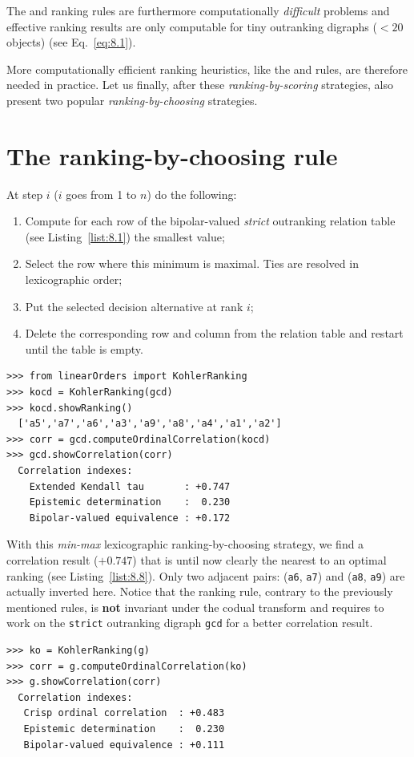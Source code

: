 The \Kemeny and \Slater ranking rules are furthermore computationally \emph{difficult} problems and effective ranking results are only computable for tiny outranking digraphs ($< 20$ objects) (see Eq.~\vref{eq:8.1}). 

More computationally efficient ranking heuristics, like the \Copeland and \NetFlows rules, are therefore needed in practice. Let us finally, after these \emph{ranking-by-scoring} strategies, also present two popular \emph{ranking-by-choosing} strategies.

\section{The \Kohler ranking-by-choosing rule}
\label{sec:8.6}

\begin{definition}\label{def:8.4}
  
\noindent At step $i$ ($i$ goes from 1 to $n$) do the following:
\begin{enumerate}[leftmargin=0.5cm,rightmargin=0.5cm,topsep=1pt]
\item Compute for each row of the bipolar-valued \emph{strict} outranking relation table (see Listing~\vref{list:8.1}) the smallest value;
\item Select the row where this minimum is maximal. Ties are resolved in lexicographic order;
\item Put the selected decision alternative at rank $i$;
\item Delete the corresponding row and column from the relation table and restart until the table is empty.
\end{enumerate}
\end{definition}
\begin{lstlisting}[caption={Computing a \Kohler ranking},label=list:8.13]   
>>> from linearOrders import KohlerRanking
>>> kocd = KohlerRanking(gcd)
>>> kocd.showRanking()
  ['a5','a7','a6','a3','a9','a8','a4','a1','a2']
>>> corr = gcd.computeOrdinalCorrelation(kocd)
>>> gcd.showCorrelation(corr)
  Correlation indexes:
    Extended Kendall tau       : +0.747
    Epistemic determination    :  0.230
    Bipolar-valued equivalence : +0.172
\end{lstlisting}

With this \emph{min-max} lexicographic ranking-by-choosing strategy, we find a correlation result ($+0.747$) that is until now clearly the nearest to an optimal \Kemeny ranking (see Listing~\vref{list:8.8}). Only two adjacent pairs: (\texttt{a6}, \texttt{a7}) and (\texttt{a8}, \texttt{a9}) are actually inverted here. Notice that the \Kohler ranking rule, contrary to the previously mentioned rules, is \textbf{not} invariant under the codual transform and requires to work on the \texttt{strict} outranking digraph \texttt{gcd} for a better correlation result.
\begin{lstlisting}
>>> ko = KohlerRanking(g)  
>>> corr = g.computeOrdinalCorrelation(ko)
>>> g.showCorrelation(corr)
  Correlation indexes:
   Crisp ordinal correlation  : +0.483
   Epistemic determination    :  0.230
   Bipolar-valued equivalence : +0.111
\end{lstlisting}


